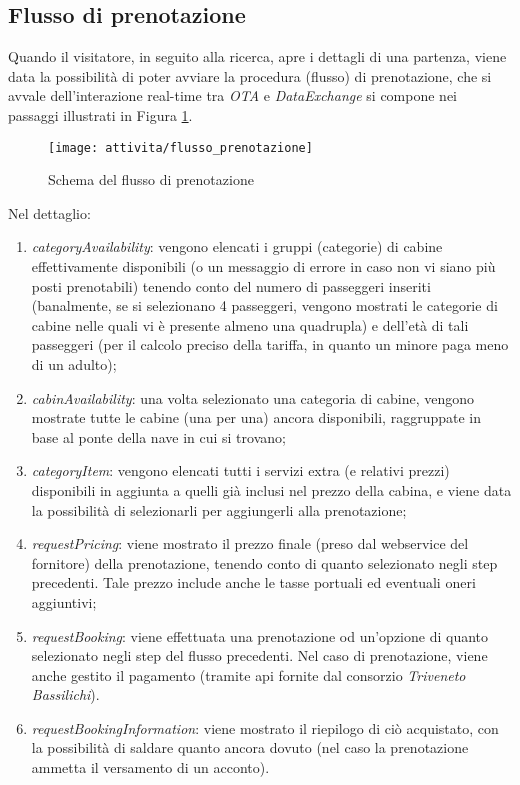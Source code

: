 \subsection{Flusso di prenotazione}
\label{section:flusso-prenotazione}
Quando il visitatore, in seguito alla ricerca, apre i dettagli di una partenza, viene data la possibilità di poter avviare la procedura (flusso) di prenotazione, che si avvale dell'interazione real-time tra \textit{OTA} e \textit{DataExchange} si compone nei passaggi illustrati in Figura \ref{figura:flusso-prenotazione}.
	\begin{figure}[!h] 
	\centering 
	\texttt{[image: attivita/flusso\_prenotazione]} 
	\caption{Schema del flusso di prenotazione}
	\label{figura:flusso-prenotazione}
\end{figure}
Nel dettaglio:
\begin{enumerate}
	\item \textit{categoryAvailability}: vengono elencati i gruppi (categorie) di cabine effettivamente disponibili (o un messaggio di errore in caso non vi siano più posti prenotabili) tenendo conto del numero di passeggeri inseriti (banalmente, se si selezionano 4 passeggeri, vengono mostrati le categorie di cabine nelle quali vi è presente almeno una quadrupla) e dell'età di tali passeggeri (per il calcolo preciso della tariffa, in quanto un minore paga meno di un adulto);
	\item \textit{cabinAvailability}: una volta selezionato una categoria di cabine, vengono mostrate tutte le cabine (una per una) ancora disponibili, raggruppate in base al ponte della nave in cui si trovano;
	\item \textit{categoryItem}: vengono elencati tutti i servizi extra (e relativi prezzi) disponibili in aggiunta a quelli già inclusi nel prezzo della cabina, e viene data la possibilità di selezionarli per aggiungerli alla prenotazione;
	\item \textit{requestPricing}: viene mostrato il prezzo finale (preso dal \gls{webservice} del fornitore) della prenotazione, tenendo conto di quanto selezionato negli step precedenti. Tale prezzo include anche le tasse portuali ed eventuali oneri aggiuntivi;
	\item \textit{requestBooking}: viene effettuata una prenotazione od un'opzione di quanto selezionato negli step del flusso precedenti. Nel caso di prenotazione, viene anche gestito il pagamento (tramite \gls{api} fornite dal consorzio \textit{Triveneto Bassilichi}).
	\item \textit{requestBookingInformation}: viene mostrato il riepilogo di ciò acquistato, con la possibilità di saldare quanto ancora dovuto (nel caso la prenotazione ammetta il versamento di un acconto).
\end{enumerate}

